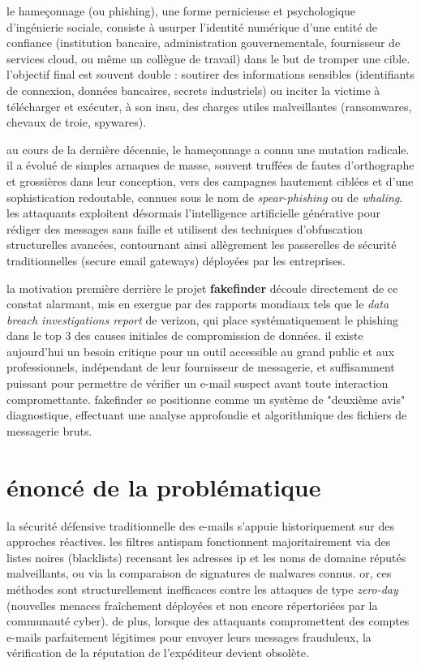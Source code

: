 \documentclass[12pt,a4paper]{report}
\begin{document}
le hameçonnage (ou phishing), une forme pernicieuse et psychologique d'ingénierie sociale, consiste à usurper l'identité numérique d'une entité de confiance (institution bancaire, administration gouvernementale, fournisseur de services cloud, ou même un collègue de travail) dans le but de tromper une cible. l'objectif final est souvent double : soutirer des informations sensibles (identifiants de connexion, données bancaires, secrets industriels) ou inciter la victime à télécharger et exécuter, à son insu, des charges utiles malveillantes (ransomwares, chevaux de troie, spywares).

au cours de la dernière décennie, le hameçonnage a connu une mutation radicale. il a évolué de simples arnaques de masse, souvent truffées de fautes d'orthographe et grossières dans leur conception, vers des campagnes hautement ciblées et d'une sophistication redoutable, connues sous le nom de \textit{spear-phishing} ou de \textit{whaling}. les attaquants exploitent désormais l'intelligence artificielle générative pour rédiger des messages sans faille et utilisent des techniques d'obfuscation structurelles avancées, contournant ainsi allègrement les passerelles de sécurité traditionnelles (secure email gateways) déployées par les entreprises.

la motivation première derrière le projet \textbf{fakefinder} découle directement de ce constat alarmant, mis en exergue par des rapports mondiaux tels que le \textit{data breach investigations report} de verizon, qui place systématiquement le phishing dans le top 3 des causes initiales de compromission de données. il existe aujourd'hui un besoin critique pour un outil accessible au grand public et aux professionnels, indépendant de leur fournisseur de messagerie, et suffisamment puissant pour permettre de vérifier un e-mail suspect avant toute interaction compromettante. fakefinder se positionne comme un système de "deuxième avis" diagnostique, effectuant une analyse approfondie et algorithmique des fichiers de messagerie bruts.

\section*{énoncé de la problématique}
la sécurité défensive traditionnelle des e-mails s'appuie historiquement sur des approches réactives. les filtres antispam fonctionnent majoritairement via des listes noires (blacklists) recensant les adresses ip et les noms de domaine réputés malveillants, ou via la comparaison de signatures de malwares connus. or, ces méthodes sont structurellement inefficaces contre les attaques de type \textit{zero-day} (nouvelles menaces fraîchement déployées et non encore répertoriées par la communauté cyber). de plus, lorsque des attaquants compromettent des comptes e-mails parfaitement légitimes pour envoyer leurs messages frauduleux, la vérification de la réputation de l'expéditeur devient obsolète.
\end{document}
